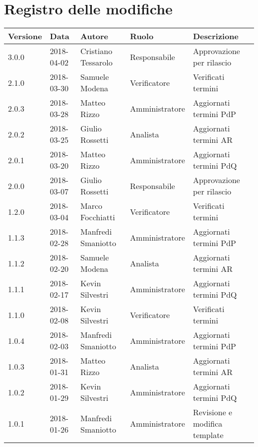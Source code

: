 \documentclass[./AnalisideiRequisiti.tex]{subfiles}
\begin{document}
	
{
	\chapter*{Registro delle modifiche}
\setlength\LTleft{-22mm}
	\begin{longtable}{|p{20mm}|p{20mm}|p{40mm}|p{30mm}|p{50mm}|}
		\hline
		\textbf{Versione} & \textbf{Data} & \textbf{Autore} & \textbf{Ruolo} & \textbf{Descrizione} \\ \hline 
		3.0.0 & 2018-04-02 & Cristiano Tessarolo & Responsabile & Approvazione per rilascio\\ \hline
		2.1.0 & 2018-03-30 & Samuele Modena & Verificatore & Verificati termini\\ \hline
		2.0.3 & 2018-03-28 & Matteo Rizzo & Amministratore & Aggiornati termini PdP\\ \hline
		2.0.2 & 2018-03-25 & Giulio Rossetti & Analista & Aggiornati termini AR \\ \hline		
		2.0.1 & 2018-03-20 & Matteo Rizzo & Amministratore & Aggiornati termini PdQ\\ \hline
		
		2.0.0 & 2018-03-07 & Giulio Rossetti & Responsabile & Approvazione per rilascio\\ \hline
		1.2.0 & 2018-03-04 & Marco Focchiatti & Verificatore & Verificati termini\\ \hline
		1.1.3 & 2018-02-28 & Manfredi Smaniotto & Amministratore & Aggiornati termini PdP\\ \hline
		1.1.2 & 2018-02-20 & Samuele Modena & Analista & Aggiornati termini AR \\ \hline		
		1.1.1 & 2018-02-17 & Kevin Silvestri & Amministratore & Aggiornati termini PdQ\\
		\hline
		1.1.0 & 2018-02-08 & Kevin Silvestri & Verificatore & Verificati termini\\ \hline
		1.0.4 & 2018-02-03 & Manfredi Smaniotto & Amministratore & Aggiornati termini PdP\\ \hline
		1.0.3 & 2018-01-31 & Matteo Rizzo & Analista & Aggiornati termini AR \\ \hline		
		1.0.2 & 2018-01-29 & Kevin Silvestri & Amministratore & Aggiornati termini PdQ\\ \hline 
		1.0.1 & 2018-01-26 & Manfredi Smaniotto & Amministratore & Revisione e modifica template\\ \hline
		

\end{longtable}}
\end{document}
